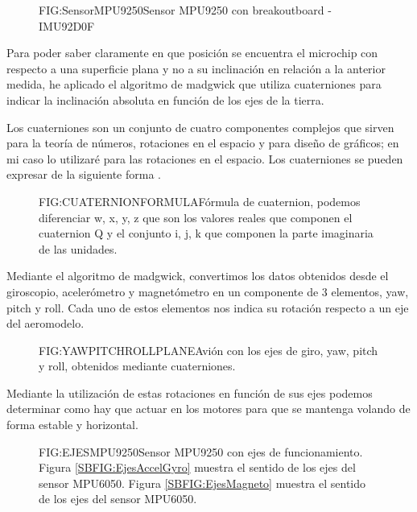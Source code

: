 \begin{figure}[Sensor MPU9250]{FIG:SensorMPU9250}{Sensor MPU9250 con breakoutboard - IMU92D0F}
\end{figure}
 
 Para poder saber claramente en que posición se encuentra el microchip con respecto a una superficie plana y no a su inclinación en relación a la anterior medida, he aplicado el algoritmo de madgwick\cite{Act2012} que utiliza cuaterniones para indicar la inclinación absoluta en función de los ejes de la tierra. 
 
 Los cuaterniones son un conjunto de cuatro componentes complejos que sirven para la teoría de números, rotaciones en el espacio y para diseño de gráficos; en mi caso lo utilizaré para las rotaciones en el espacio. Los cuaterniones se pueden expresar de la siguiente forma \cite{Graves1999}.
 
\begin{figure}[Fórmula cuaternion]{FIG:CUATERNIONFORMULA}{Fórmula de cuaternion, podemos diferenciar w, x, y, z que son los valores reales que componen el cuaternion Q y el conjunto i, j, k que componen la parte imaginaria de las unidades. }
\end{figure}

   Mediante el algoritmo de madgwick, convertimos los datos obtenidos desde el giroscopio, acelerómetro y magnetómetro en un componente de 3 elementos, yaw, pitch y roll.
   Cada uno de estos elementos nos indica su rotación respecto a un eje del aeromodelo. 
 

\begin{figure}[Ejes yaw, pitch y roll]{FIG:YAWPITCHROLLPLANE}{Avión con los ejes de giro, yaw, pitch y roll, obtenidos mediante cuaterniones.}
\end{figure}
 
 Mediante la utilización de estas rotaciones en función de sus ejes podemos determinar como hay que actuar en los motores para que se mantenga volando de forma estable y horizontal.
  

\begin{figure}[Ejes MPU9250]{FIG:EJESMPU9250}{Sensor MPU9250 con ejes de funcionamiento. Figura \ref{SBFIG:EjesAccelGyro} muestra el sentido de los ejes del sensor MPU6050. Figura \ref{SBFIG:EjesMagneto} muestra el sentido de los ejes del sensor MPU6050.}
   \quad
\end{figure} 

